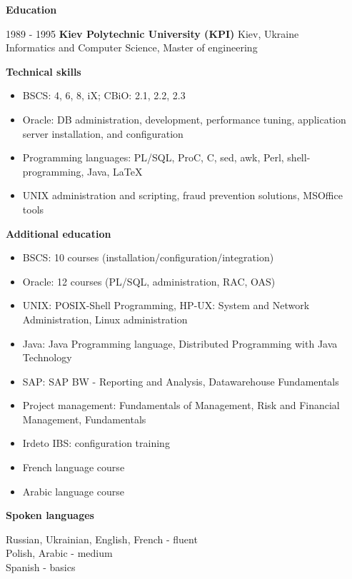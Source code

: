 \documentclass[10pt,a4paper]{extbook}
\begin{document}
\par\vspace{5mm}
{\large \textbf {Education} \par}
\vspace{2mm}
1989 - 1995 \hspace{10mm} \textbf{Kiev Polytechnic University (KPI)} \hfill Kiev, Ukraine \\
Informatics and Computer Science, Master of engineering

\par\vspace{5mm}
{\large \textbf {Technical skills} \par}
\begin{itemize}[noitemsep,topsep=3mm,parsep=0pt,partopsep=0pt,itemindent=0pt,leftmargin=4mm]
	\item BSCS: 4, 6, 8, iX; CBiO: 2.1, 2.2, 2.3
	\item Oracle: DB administration, development, performance tuning, application server installation, and configuration
	\item Programming languages: PL/SQL, ProC, C, sed, awk, Perl, shell-programming, Java, LaTeX
	\item UNIX administration and scripting, fraud prevention solutions, MSOffice tools
\end{itemize}

\par\vspace{5mm}
{\large \textbf {Additional education} \par}
\begin{itemize}[noitemsep,topsep=3mm,parsep=0pt,partopsep=0pt,itemindent=0pt,leftmargin=4mm]
	\item BSCS: 10 courses (installation/configuration/integration)
	\item Oracle: 12 courses (PL/SQL, administration, RAC, OAS)
	\item UNIX: POSIX-Shell Programming, HP-UX: System and Network Administration, Linux administration
	\item Java: Java Programming language, Distributed Programming with Java Technology
	\item SAP: SAP BW - Reporting and Analysis, Datawarehouse Fundamentals
	\item Project management: Fundamentals of Management, Risk and Financial Management, Fundamentals
	\item Irdeto IBS: configuration training
	\item French language course
	\item Arabic language course
\end{itemize}

\par\vspace{5mm}
{\large \textbf {Spoken languages} \par}
\vspace{2mm}
Russian, Ukrainian, English, French - fluent \\
Polish, Arabic - medium \\
Spanish - basics
\end{document}
